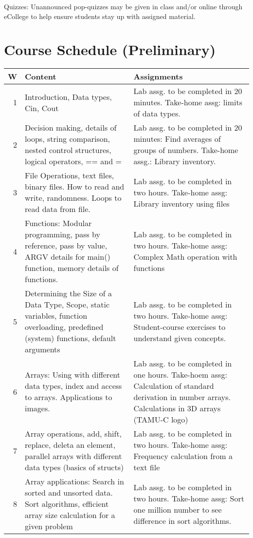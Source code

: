 \documentclass[11pt]{article}
\begin{document}
Quizzes: Unannounced pop-quizzes may be given in class and/or online
through eCollege to help ensure students stay up with assigned
material.


\section*{Course Schedule (Preliminary)}
\label{sec-11}

\tiny
\begin{center}
\begin{tabular}{rll}
\hline
\textbf{W} & \textbf{Content} & \textbf{Assignments}\\
\hline
1 & Introduction, Data types, Cin, Cout & Lab assg. to be completed in 20 minutes. Take-home assg: limits of data types.\\
\hline
2 & Decision making, details of loops, string comparison, nested control structures, logical operators, == and = & Lab assg. to be completed in 20 minutes: Find averages of groups of numbers. Take-home assg.: Library inventory.\\
\hline
3 & File Operations, text files, binary files.  How to read and write, randomness.  Loops to read data from file. & Lab assg. to be completed in two hours. Take-home assg: Library inventory using files\\
\hline
4 & Functions: Modular programming, pass by reference, pass by value, ARGV details for main() function, memory details of functions. & Lab assg. to be completed in two hours. Take-home assg: Complex Math operation with functions\\
\hline
5 & Determining the Size of a Data Type, Scope, static variables, function overloading, predefined (system) functions, default arguments & Lab assg. to be completed in two hours. Take-home assg: Student-course exercises to understand given concepts.\\
\hline
6 & Arrays: Using with different data types, index and access to arrays.  Applications to images. & Lab assg. to be completed in one hours. Take-hoem assg: Calculation of standard derivation in number arrays.  Calculations in 3D arrays (TAMU-C logo)\\
\hline
7 & Array operations, add, shift, replace, deleta an element, parallel arrays with different data types (basics of structs) & Lab assg. to be completed in two hours. Take-home assg: Frequency calculation from a text file\\
\hline
8 & Array applications: Search in sorted and unsorted data.  Sort algorithms, efficient array size calculation for a given problem & Lab assg. to be completed in two hours. Take-home assg: Sort one million number to see difference in sort algorithms.\\

\end{tabular}
\end{center}
\end{document}
